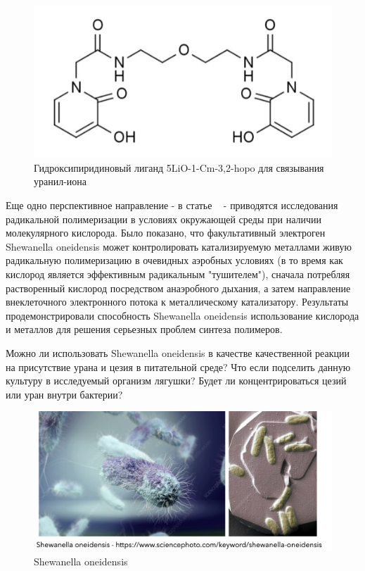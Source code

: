 \documentclass[11pt]{article}
\begin{document}
\begin{figure}[!htpb]
\centering
\includegraphics[scale=0.9]{ligand}
\caption{Гидроксипиридиновый лиганд 5LiO-1-Cm-3,2-hopo для связывания уранил-иона}
\label{}
\end{figure}

Еще одно перспективное направление - в статье ~\cite{gang} - приводятся исследования радикальной полимеризации в условиях окружающей среды при наличии молекулярного кислорода. Было показано, что факультативный электроген Shewanella oneidensis может контролировать катализируемую металлами живую радикальную полимеризацию в очевидных аэробных условиях (в то время как кислород является эффективным радикальным "тушителем"), сначала потребляя растворенный кислород посредством анаэробного дыхания, а затем направление внеклеточного электронного потока к металлическому катализатору. Результаты продемонстрировали способность Shewanella oneidensis использование кислорода и металлов для решения серьезных проблем синтеза полимеров. 

Можно ли использовать Shewanella oneidensis в качестве качественной реакции на присутствие урана и цезия в питательной среде? Что если подселить данную культуру в исследуемый организм лягушки? Будет ли концентрироваться цезий или уран внутри бактерии?

\begin{figure}[!htpb]
\centering
\includegraphics[scale=0.35]{shewanella}
\caption{Shewanella oneidensis}
\label{}
\end{figure}
\end{document}
